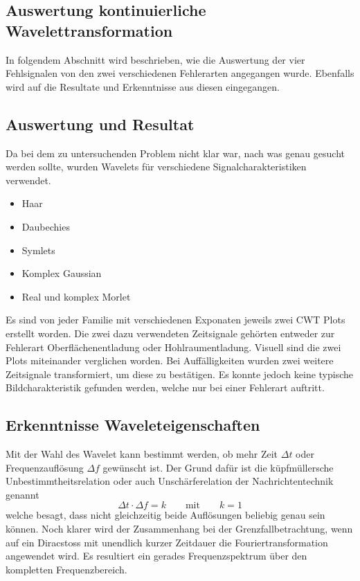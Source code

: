 \begin{refsection}
\section{Auswertung kontinuierliche Wavelettransformation}
In folgendem Abschnitt wird beschrieben, wie die Auswertung der vier Fehlsignalen von den zwei verschiedenen Fehlerarten angegangen wurde. 
Ebenfalls wird auf die Resultate und Erkenntnisse aus diesen eingegangen.
\subsection{Auswertung und Resultat}
Da bei dem zu untersuchenden Problem nicht klar war, nach was genau gesucht werden sollte, wurden Wavelets für verschiedene Signalcharakteristiken verwendet.
\begin{itemize}
	\item Haar
	\item Daubechies 
	\item Symlets
	\item Komplex Gaussian
	\item Real und komplex Morlet
\end{itemize}
Es sind von jeder Familie mit verschiedenen Exponaten jeweils zwei CWT Plots erstellt worden. 
%
Die zwei dazu verwendeten Zeitsignale gehörten entweder zur Fehlerart Oberflächenentladung oder Hohlraumentladung.
Visuell sind die zwei Plots miteinander verglichen worden.
Bei Auffälligkeiten wurden zwei weitere Zeitsignale transformiert, um diese zu bestätigen.
Es konnte jedoch keine typische Bildcharakteristik gefunden werden, welche nur bei einer Fehlerart auftritt.

\subsection{Erkenntnisse Waveleteigenschaften}
Mit der Wahl des Wavelet kann bestimmt werden, ob mehr Zeit $\Delta t$ oder Frequenzauflösung $\Delta f$ gewünscht ist. 
Der Grund dafür ist die küpfmüllersche Unbestimmtheitsrelation oder auch Unschärferelation der Nachrichtentechnik genannt
%
\begin{equation}
\Delta t \cdot \Delta f = k
\qquad\text{mit}\qquad
k = 1
\end{equation}
welche besagt, dass nicht gleichzeitig beide Auflösungen beliebig genau sein können.
Noch klarer wird der Zusammenhang bei der Grenzfallbetrachtung, wenn auf ein Diracstoss mit unendlich kurzer Zeitdauer die Fouriertransformation angewendet wird.
Es resultiert ein gerades Frequenzspektrum über den kompletten Frequenzbereich.


\end{refsection}
